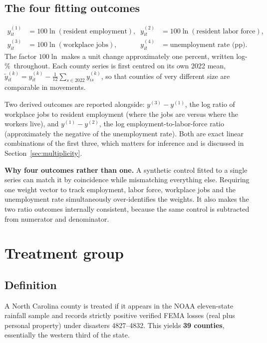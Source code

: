 \documentclass[11pt,a4paper]{article}
\newcommand{\lp}{log-\%}
\begin{document}
\subsection{The four fitting outcomes}
\begin{equation}
\begin{aligned}
y^{(1)}_{it}&=100\ln(\text{resident employment}), &\quad y^{(2)}_{it}&=100\ln(\text{resident labor force}),\\
y^{(3)}_{it}&=100\ln(\text{workplace jobs}), &\quad y^{(4)}_{it}&=\text{unemployment rate (pp)}.
\end{aligned}
\end{equation}
The factor $100\ln$ makes a unit change approximately one percent, written \lp\ throughout. Each
county series is first centred on its own 2022 mean,
$\tilde y^{(k)}_{it}=y^{(k)}_{it}-\tfrac{1}{12}\sum_{s\in 2022}y^{(k)}_{is}$, so that counties of very
different size are comparable in movements.

Two derived outcomes are reported alongside: $y^{(3)}-y^{(1)}$, the log ratio of workplace jobs to
resident employment (where the jobs are versus where the workers live), and $y^{(1)}-y^{(2)}$, the log
employment-to-labor-force ratio (approximately the negative of the unemployment rate). Both are exact
linear combinations of the first three, which matters for inference and is discussed in
Section~\ref{sec:multiplicity}.

\begin{plainbox}
\textbf{Why four outcomes rather than one.} A synthetic control fitted to a single series can match it
by coincidence while mismatching everything else. Requiring one weight vector to track employment,
labor force, workplace jobs and the unemployment rate simultaneously over-identifies the weights.
It also makes the two ratio outcomes internally consistent, because the same control is subtracted
from numerator and denominator.
\end{plainbox}

\section{Treatment group}

\subsection{Definition}
A North Carolina county is treated if it appears in the NOAA eleven-state rainfall sample and records
strictly positive verified FEMA losses (real plus personal property) under disasters 4827--4832. This
yields \textbf{39 counties}, essentially the western third of the state.
\end{document}
